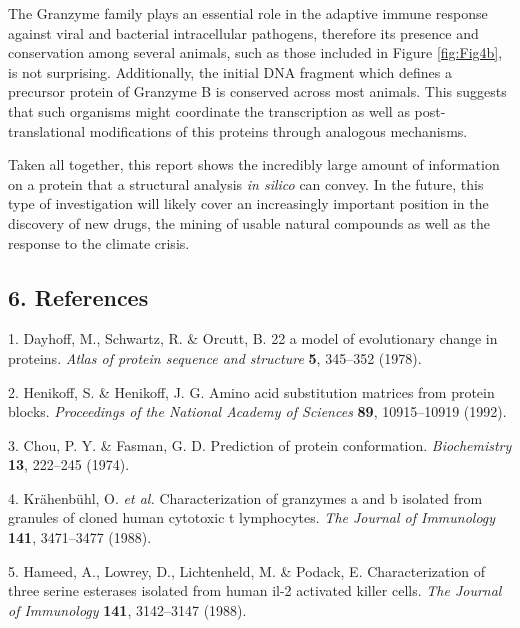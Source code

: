 \documentclass[
]{article}
\begin{document}
The Granzyme family plays an essential role in the adaptive immune response against viral and bacterial intracellular pathogens, therefore its presence and conservation among several animals, such as those included in Figure \ref{fig:Fig4b}, is not surprising. Additionally, the initial DNA fragment which defines a precursor protein of Granzyme B is conserved across most animals. This suggests that such organisms might coordinate the transcription as well as post-translational modifications of this proteins through analogous mechanisms.

Taken all together, this report shows the incredibly large amount of information on a protein that a structural analysis \emph{in silico} can convey. In the future, this type of investigation will likely cover an increasingly important position in the discovery of new drugs, the mining of usable natural compounds as well as the response to the climate crisis.

\hypertarget{references}{%
\subsection*{6. References}\label{references}}

\hypertarget{refs}{}
\leavevmode\hypertarget{ref-dayhoff197822}{}%
1. Dayhoff, M., Schwartz, R. \& Orcutt, B. 22 a model of evolutionary change in proteins. \emph{Atlas of protein sequence and structure} \textbf{5}, 345--352 (1978).

\leavevmode\hypertarget{ref-henikoff1992amino}{}%
2. Henikoff, S. \& Henikoff, J. G. Amino acid substitution matrices from protein blocks. \emph{Proceedings of the National Academy of Sciences} \textbf{89}, 10915--10919 (1992).

\leavevmode\hypertarget{ref-chou1974prediction}{}%
3. Chou, P. Y. \& Fasman, G. D. Prediction of protein conformation. \emph{Biochemistry} \textbf{13}, 222--245 (1974).

\leavevmode\hypertarget{ref-krahenbuhl1988characterization}{}%
4. Krähenbühl, O. \emph{et al.} Characterization of granzymes a and b isolated from granules of cloned human cytotoxic t lymphocytes. \emph{The Journal of Immunology} \textbf{141}, 3471--3477 (1988).

\leavevmode\hypertarget{ref-hameed1988characterization}{}%
5. Hameed, A., Lowrey, D., Lichtenheld, M. \& Podack, E. Characterization of three serine esterases isolated from human il-2 activated killer cells. \emph{The Journal of Immunology} \textbf{141}, 3142--3147 (1988).
\end{document}
